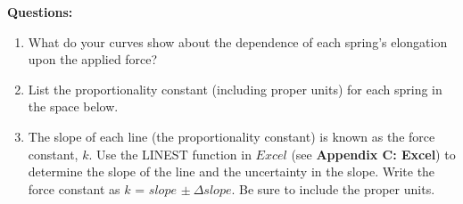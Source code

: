 \pagebreak

\textbf{Questions:}

\begin{enumerate}
\item What do your curves show about the dependence of each spring's elongation upon the applied force?\vspace{30mm}

\item List the proportionality constant (including proper units) for each spring in the space below.\vspace{30mm}

\item The slope of each line (the proportionality constant) is known as the 
force constant, $k$. Use the LINEST function in $Excel$ (see \textbf{Appendix C:
 Excel}) to determine the slope of the line and the uncertainty in the slope. 
Write the force constant as $k$ = $slope$ \( \pm \ \Delta  slope\).  Be sure to 
include the proper units.
\end{enumerate}
